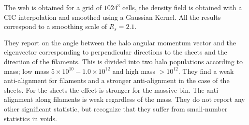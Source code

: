 \documentclass[useAMS,usenatbib]{mn2e}
\newcommand{\hMpc}{{\ifmmode{h^{-1}{\rm Mpc}}\else{$h^{-1}$Mpc }\fi}}
\begin{document}
\begin{itemize}
The web is obtained for a grid of $1024^3$ cells, the density field is
obtained with a CIC interpolation and smoothed using a Gaussian
Kernel. All the results correspond to a smoothing scale of
$R_{s}=2.1$\hMpc.

They report on the angle between the halo angular momentum vector and
the eigenvector corresponding to perpendicular directions to the
sheets and the direction of the filaments. This is divided into two halo
populations according to mass; low mass $5\times 10^{10} - 1.0\times 10^{12}$ and
high mass $>10^{12}$. They find a weak anti-alignment for filaments
and a stronger anti-alignment in the case of the sheets. For the
sheets the effect is stronger for the massive bin. The anti-alignment
along filaments is weak regardless of the mass. They do not report any
other significant statistic, but recognize that they suffer from
small-number statistics in voids.

\end{itemize}
\end{document}
